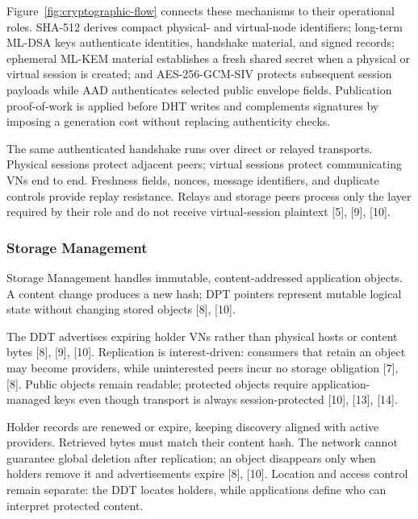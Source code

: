 \documentclass[12pt]{article}
\begin{document}
Figure~\ref{fig:cryptographic-flow} connects these mechanisms to their operational roles. SHA-512 derives compact physical- and virtual-node identifiers; long-term ML-DSA keys authenticate identities, handshake material, and signed records; ephemeral ML-KEM material establishes a fresh shared secret when a physical or virtual session is created; and AES-256-GCM-SIV protects subsequent session payloads while AAD authenticates selected public envelope fields. Publication proof-of-work is applied before DHT writes and complements signatures by imposing a generation cost without replacing authenticity checks.

\thesiscryptographicflowtikz

The same authenticated handshake runs over direct or relayed transports. Physical sessions protect adjacent peers; virtual sessions protect communicating VNs end to end. Freshness fields, nonces, message identifiers, and duplicate controls provide replay resistance. Relays and storage peers process only the layer required by their role and do not receive virtual-session plaintext [5], [9], [10].

\subsubsection{Storage Management}

Storage Management handles immutable, content-addressed application objects. A content change produces a new hash; DPT pointers represent mutable logical state without changing stored objects [8], [10].


\thesisddttikz


The DDT advertises expiring holder VNs rather than physical hosts or content bytes [8], [9], [10]. Replication is interest-driven: consumers that retain an object may become providers, while uninterested peers incur no storage obligation [7], [8]. Public objects remain readable; protected objects require application-managed keys even though transport is always session-protected [10], [13], [14].

\thesisephemeraltikz

Holder records are renewed or expire, keeping discovery aligned with active providers. Retrieved bytes must match their content hash. The network cannot guarantee global deletion after replication; an object disappears only when holders remove it and advertisements expire [8], [10]. Location and access control remain separate: the DDT locates holders, while applications define who can interpret protected content.
\end{document}
